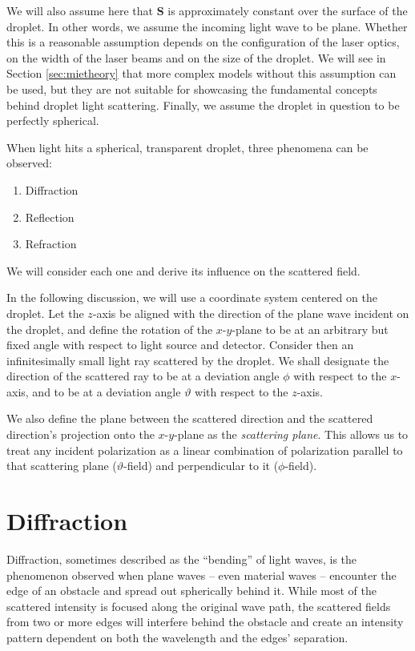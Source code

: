 \documentclass[11.5pt,oneside]{book}
\begin{document}
We will also assume here that $\mathbf{S}$ is approximately constant over the
surface of the droplet. In other words, we assume the incoming light wave to be
plane. Whether this is a reasonable assumption depends on the configuration of
the laser optics, on the width of the laser beams and on the size of the
droplet. We will see in Section \ref{sec:mietheory} that more complex models
without this assumption can be used, but they are not suitable for showcasing
the fundamental concepts behind droplet light scattering.  Finally, we assume
the droplet in question to be perfectly spherical.

When light hits a spherical, transparent droplet, three phenomena can be
observed:
\begin{enumerate}
    \item Diffraction
    \item Reflection
    \item Refraction
\end{enumerate}
We will consider each one and derive its influence on the
scattered field.

In the following discussion, we will use a coordinate system centered on the
droplet. Let the $z$-axis be aligned with the direction of the plane wave
incident on the droplet, and define the rotation of the $x$-$y$-plane to be at an
arbitrary but fixed angle with respect to light source and detector. Consider
then an infinitesimally small light ray scattered by the droplet. We shall
designate the direction of the scattered ray to be at a deviation angle $\phi$ with
respect to the $x$-axis, and to be at a deviation angle $\vartheta$ with respect
to the $z$-axis.

We also define the plane between the scattered direction and the scattered
direction's projection onto the $x$-$y$-plane as the \emph{scattering plane}. This
allows us to treat any incident polarization as a linear combination of
polarization parallel to that scattering plane ($\vartheta$-field) and
perpendicular to it ($\phi$-field). 

\section{Diffraction} Diffraction, sometimes described as the ``bending'' of
light waves, is the phenomenon observed when plane waves -- even material waves
-- encounter the edge of an obstacle and spread out spherically behind it. While
most of the scattered intensity is focused along the original wave path, the
scattered fields from two or more edges will interfere behind the obstacle and
create an intensity pattern dependent on both the wavelength and the edges'
separation.
\end{document}
